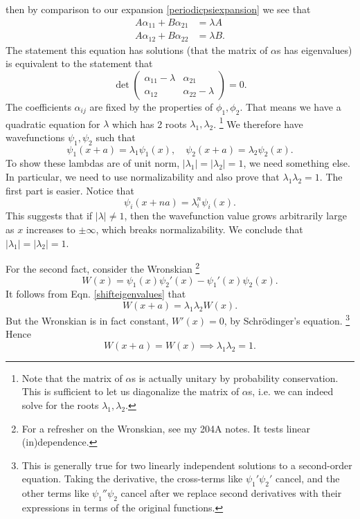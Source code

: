 then by comparison to our expansion \ref{periodicpsiexpansion} we see that
\begin{align}
    A \alpha_{11}  + B \alpha_{21} &= \lambda A\\
    A \alpha_{12} + B \alpha_{22} &= \lambda B.
\end{align}
The statement this equation has solutions (that the matrix of $\alpha$s has eigenvalues) is equivalent to the statement that
\begin{equation}
    \det \begin{pmatrix}
    \alpha_{11}-\lambda & \alpha_{21}\\
    \alpha_{12} & \alpha_{22}-\lambda
    \end{pmatrix} =0.
\end{equation}
The coefficients $\alpha_{ij}$ are fixed by the properties of $\phi_1,\phi_2$. That means we have a quadratic equation for $\lambda$ which has 2 roots $\lambda_1,\lambda_2$.%
    \footnote{Note that the matrix of $\alpha$s is actually unitary by probability conservation. This is sufficient to let us diagonalize the matrix of $\alpha$s, i.e. we can indeed solve for the roots $\lambda_1,\lambda_2$.}
We therefore have wavefunctions $\psi_1,\psi_2$ such that
\begin{equation}\label{shifteigenvalues}
    \psi_1(x+a) = \lambda_1 \psi_1(x),\quad \psi_2(x+a) = \lambda_2 \psi_2 (x).
\end{equation}
To show these lambdas are of unit norm, $|\lambda_1|=|\lambda_2| = 1$, we need something else. In particular, we need to use normalizability and also prove that $\lambda_1\lambda_2=1$. The first part is easier. Notice that
\begin{equation}
    \psi_i(x+na) = \lambda_i^n \psi_i(x).
\end{equation}
This suggests that if $|\lambda|\neq 1$, then the wavefunction value grows arbitrarily large as $x$ increases to $\pm \infty$, which breaks normalizability.%
We conclude that $|\lambda_1|=|\lambda_2| = 1$.

For the second fact, consider the Wronskian%
    \footnote{For a refresher on the Wronskian, see my 204A notes. It tests linear (in)dependence.}
\begin{equation}
    W(x) = \psi_1(x) \psi_2'(x) - \psi_1'(x) \psi_2(x).
\end{equation}
It follows from Eqn. \ref{shifteigenvalues} that
\begin{equation}
    W(x+a)=\lambda_1\lambda_2 W(x).
\end{equation}
But the Wronskian is in fact constant, $W'(x)=0$, by Schr\"odinger's equation.%
    \footnote{This is generally true for two linearly independent solutions to a second-order equation. Taking the derivative, the cross-terms like $\psi_1' \psi_2'$ cancel, and the other terms like $\psi_1'' \psi_2$ cancel after we replace second derivatives with their expressions in terms of the original functions.}
Hence
\begin{equation}
    W(x+a)=W(x) \implies \lambda_1 \lambda_2 =1.
\end{equation}

